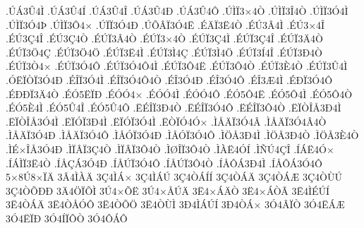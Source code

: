 {.^^da^^c13^^db4^^cc
.^^da^^c13^^db4^^cd
.^^da^^c13^^db4^^ce
.^^da^^c13^^db4^^d0
.^^da^^c13^^db4^^d4
.^^da^^cc^^cf3^^d74^^d2
.^^da^^cc^^cf3^^ce4^^d2
.^^da^^cc^^cf3^^d34^^cc
.^^da^^cc^^cf3^^d34^^de
.^^da^^cc^^cf3^^d44^^d7
.^^da^^cf^^cf3^^d34^^d0
.^^da^^d5^^c2^^cf3^^d34^^cb
.^^c9^^c4^^cf3^^cb4^^d2
.^^c9^^da3^^c24^^cc
.^^c9^^da3^^d74^^ce
.^^c9^^da3^^c74^^ce
.^^c9^^da3^^c74^^d2
.^^c9^^da^^cf3^^c24^^d2
.^^c9^^da^^cf3^^d74^^d2
.^^c9^^da^^cf3^^c74^^cc
.^^c9^^da^^cf3^^c74^^ce
.^^c9^^da^^cf3^^c44^^d2
.^^c9^^da^^cf3^^d64^^c7
.^^c9^^da^^cf3^^d64^^d6
.^^c9^^da^^cf3^^cb4^^cc
.^^c9^^da^^cf3^^cc4^^c7
.^^c9^^da^^cf3^^cc4^^d6
.^^c9^^da^^cf3^^cd4^^ce
.^^c9^^da^^cf3^^d04^^d2
.^^c9^^da^^cf3^^d24^^d7
.^^c9^^da^^cf3^^d34^^d4
.^^c9^^da^^cf3^^d34^^d44^^cc
.^^c9^^da^^cf3^^d44^^cb
.^^c9^^da^^cf3^^d44^^d2
.^^c9^^da^^cf3^^c84^^d2
.^^c9^^da^^cf3^^db4^^cc
.^^d3^^cb^^cf^^d2^^cf3^^d34^^d0
.^^c9^^ce^^cf3^^d34^^cc
.^^c9^^ce^^cf3^^d34^^d44^^d2
.^^c9^^ce3^^d34^^d0
.^^c9^^ce3^^d34^^d4
.^^c9^^ce3^^c64^^cc
.^^c9^^d0^^cf3^^d34^^d4
.^^c9^^d0^^d0^^cf3^^c44^^d2
.^^c9^^d35^^cb^^cf^^d0
.^^c9^^d3^^d34^^d7
.^^c9^^d3^^d34^^cc
.^^c9^^d3^^d34^^d4
.^^c9^^d35^^d44^^cb
.^^c9^^d35^^d44^^cc
.^^c9^^d35^^d44^^d2
.^^c9^^d35^^c84^^cc
.^^c9^^d35^^db4^^ce
.^^c9^^d35^^db4^^d4
.^^cb^^c9^^ce^^cf3^^d04^^d2
.^^cb^^c9^^ce^^cf3^^d34^^d4
.^^cb^^c9^^ce^^cf3^^d44^^d2
.^^cb^^cf^^d2^^ce^^c53^^d04^^cc
.^^cb^^cf^^d2^^ce^^c53^^d34^^cc
.^^cb^^cf^^d3^^cf3^^d04^^cc
.^^cb^^cf^^d3^^cf3^^d34^^cc
.^^cb^^d2^^cf^^d34^^d3^^d7
.^^cc^^c5^^c4^^cf3^^d34^^c2
.^^cc^^c5^^c4^^cf3^^d34^^c24^^d2
.^^cc^^c5^^c4^^cf3^^d34^^d0
.^^cc^^c5^^c4^^cf3^^d34^^d4
.^^cc^^c5^^d3^^cf3^^d34^^d0
.^^cc^^c5^^d3^^cf3^^d34^^d4
.^^cc^^d6^^c53^^d04^^cc
.^^cc^^d6^^c53^^d04^^d2
.^^cc^^d6^^c53^^c84^^d2
.^^cc^^c9^^d7^^ce^^c53^^d34^^d0
.^^cc^^cf^^c2^^cf3^^c74^^d2
.^^cc^^cf^^c2^^cf3^^d44^^d2
.^^cc^^d8^^ce^^cf3^^d44^^d2
.^^cc^^c0^^cb4^^d3^^cd
.^^cc^^d1^^da4^^c7^^ce
.^^cd^^c1^^cb4^^d3^^d7
.^^cd^^c1^^cc^^cf3^^cb4^^d2
.^^cd^^c5^^c7^^c13^^d34^^d0
.^^cd^^c5^^da^^cf3^^d34^^d4
.^^cd^^c5^^da^^cf3^^d44^^d2
.^^cd^^c5^^d4^^c13^^d04^^cc
.^^cd^^c5^^d4^^c13^^d34^^d4
5^^d78^^da8^^d7^^cf^^c4
3^^c24^^cc^^c0^^c4
3^^c74^^cc^^c1^^d7
3^^c74^^cc^^c1^^da
3^^c74^^d2^^c1^^cd^^cd
3^^c74^^d2^^c1^^c4
3^^c74^^d2^^c1^^c6
3^^c74^^d2^^d9^^da
3^^c74^^d2^^d5^^d0^^d0
3^^c44^^d6^^cf^^d5^^cc
3^^da4^^d7^^d5^^cb
3^^da4^^d7^^c5^^da^^c4
3^^cb4^^d7^^c1^^c4^^d2
3^^cb4^^d7^^c1^^d2^^c3
3^^cb4^^cc^^c9^^da^^cd
3^^cb4^^d2^^c1^^c4
3^^cb4^^d2^^c5^^d3^^d4
3^^cb4^^d2^^d5^^d6
3^^cb4^^d2^^d9^^cc
3^^d04^^cc^^c1^^da^^cd
3^^d04^^d2^^c1^^d7
3^^d34^^c2^^cf^^d2
3^^d34^^cb^^c1^^c6
3^^d34^^cb^^cf^^d0
3^^d34^^cd^^cf^^d4^^d2
3^^d34^^d4^^c1^^d4
}
